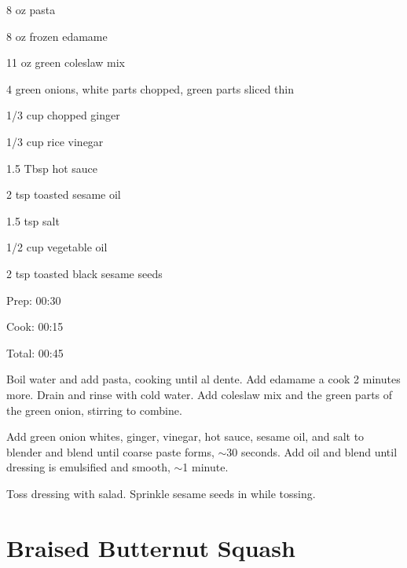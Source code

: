 \documentclass[oneside]{book}  %
\def\thisrecipe{}  %
\newcommand{\recipe}[1]{\section{#1}\def\thisrecipe{: #1}} %
\newcommand{\about}{$\sim$}
\begin{document}
\begin{IT}
  \begin{ingredients}[serves=6]
    \item[8 oz] pasta
    \item[8 oz] frozen edamame
    \item[11 oz] green coleslaw mix
    \item[4] green onions, white parts chopped, green parts sliced thin
    \item[1/3 cup] chopped ginger
    \item[1/3 cup] rice vinegar
    \item[1.5 Tbsp] hot sauce
    \item[2 tsp] toasted sesame oil
    \item[1.5 tsp] salt
    \item[1/2 cup] vegetable oil
    \item[2 tsp] toasted black sesame seeds
  \end{ingredients}

  \switchcolumn

  \begin{timeline}
    \item[Prep:]  00:30
    \item[Cook:]  00:15
    \item[Total:] 00:45
  \end{timeline}
\end{IT}

\begin{directions}
  \item Boil water and add pasta, cooking until al dente. Add edamame a cook 2
  minutes more. Drain and rinse with cold water. Add coleslaw mix and the green
  parts of the green onion, stirring to combine.

  \item Add green onion whites, ginger, vinegar, hot sauce, sesame oil, and salt
  to blender and blend until coarse paste forms, \about 30 seconds. Add oil
  and blend until dressing is emulsified and smooth, \about 1 minute.

  \item Toss dressing with salad. Sprinkle sesame seeds in while tossing.
\end{directions}
\recipe{Braised Butternut Squash} \label{recipe:braised_butternut_squash} %
\end{document}
